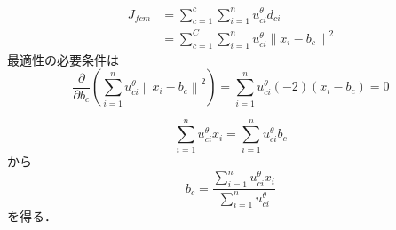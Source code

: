 \documentclass[uplatex,dvipdfmx,10pt]{beamer}
\begin{document}
\begin{frame}

\begin{equation}
\begin{aligned}
J_{f c m} &=\sum_{c=1}^{c} \sum_{i=1}^{n} u_{c i}^{\theta} d_{c i} \\
&=\sum_{c=1}^C \sum_{i=1}^{n} u_{c i}^{\theta}\left\|x_{i}-b _c\right\|^{2}
\end{aligned}
\end{equation}
最適性の必要条件は
\begin{equation}
\frac{\partial}{\partial b_c} \left(\sum_{i=1}^{n} u_{c i}^{\theta}\left\|x_{i}-b _c\right\|^{2}\right)=\sum_{i=1}^{n} u_{c i}^{\theta}(-2)\left(x_{i}-b _c\right)=0
\end{equation}

\begin{equation}
\sum_{i=1}^{n} u_{c i}^{\theta} x_{i}=\sum_{i=1}^{n} u_{c i}^{\theta} b_{c}
\end{equation}
から
\begin{equation}
b_{c}=\dfrac{\displaystyle \sum_{i=1}^{n} u_{c i}^{\theta} x_{i}}{\displaystyle \sum_{i=1}^{n} u_{c i}^{\theta}}
\end{equation}
を得る．
\end{frame}

\begin{comment}

\section{FCM法とkmeans法の局所解頻度の比較}
データセットとして，winequality-red(インスタンス数：1599，パラメータ数：11)を用いた．

1000回試行したところ，FCM法では局所解は発生しなかった．
kmeans法では，14種類の局所解が得られその頻度は，2,46,285,25,22,14,252,112,9,1,31,5,2,194回ずつ起こった．

\begin{center}
\begin{verbatim}
  Input variables (based on physicochemical tests):
  1 - fixed acidity
  2 - volatile acidity
  3 - citric acid
  4 - residual sugar
  5 - chlorides
  6 - free sulfur dioxide
  7 - total sulfur dioxide
  8 - density
  9 - pH
  10 - sulphates
  11 - alcohol
  Output variable (based on sensory data):
  12 - quality (score between 0 and 10)
\end{verbatim}
\end{center}
\end{comment}
\end{document}
